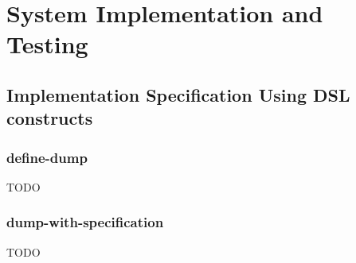 \chapter{System Implementation and Testing}

\section{Implementation Specification Using DSL constructs}
\subsection{define-dump}
TODO
\subsection{dump-with-specification}
TODO
